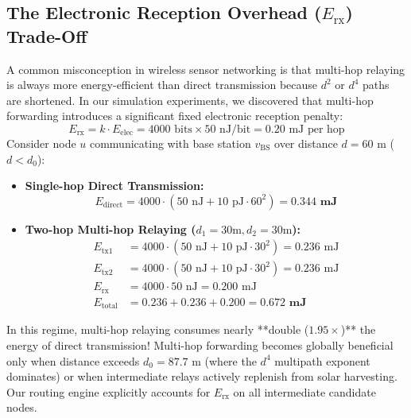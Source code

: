 \documentclass[journal]{IEEEtran}
\begin{document}
\subsection{The Electronic Reception Overhead ($E_{\text{rx}}$) Trade-Off}
A common misconception in wireless sensor networking is that multi-hop relaying is always more energy-efficient than direct transmission because $d^2$ or $d^4$ paths are shortened. In our simulation experiments, we discovered that multi-hop forwarding introduces a significant fixed electronic reception penalty:
\begin{equation}
E_{\text{rx}} = k \cdot E_{\text{elec}} = 4000\text{ bits} \times 50\text{ nJ/bit} = 0.20\text{ mJ per hop}
\end{equation}
Consider node $u$ communicating with base station $v_{\text{BS}}$ over distance $d = 60\text{ m}$ ($d < d_0$):
\begin{itemize}
    \item \textbf{Single-hop Direct Transmission:}
    \begin{equation}
    E_{\text{direct}} = 4000 \cdot (50\text{ nJ} + 10\text{ pJ} \cdot 60^2) = \mathbf{0.344\text{ mJ}}
    \end{equation}
    \item \textbf{Two-hop Multi-hop Relaying ($d_1 = 30\text{m}, d_2 = 30\text{m}$):}
    \begin{align}
    E_{\text{tx1}} &= 4000 \cdot (50\text{ nJ} + 10\text{ pJ} \cdot 30^2) = 0.236\text{ mJ} \\
    E_{\text{tx2}} &= 4000 \cdot (50\text{ nJ} + 10\text{ pJ} \cdot 30^2) = 0.236\text{ mJ} \\
    E_{\text{rx}}  &= 4000 \cdot 50\text{ nJ} = 0.200\text{ mJ} \\
    E_{\text{total}} &= 0.236 + 0.236 + 0.200 = \mathbf{0.672\text{ mJ}}
    \end{align}
\end{itemize}
In this regime, multi-hop relaying consumes nearly **double ($1.95\times$)** the energy of direct transmission! Multi-hop forwarding becomes globally beneficial only when distance exceeds $d_0 = 87.7\text{ m}$ (where the $d^4$ multipath exponent dominates) or when intermediate relays actively replenish from solar harvesting. Our routing engine explicitly accounts for $E_{\text{rx}}$ on all intermediate candidate nodes.
\end{document}
